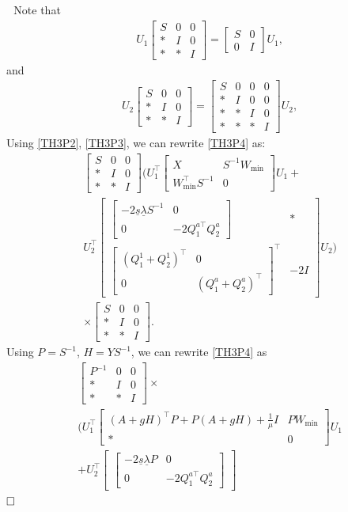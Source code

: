 \documentclass[journal,twoside,web]{ieeecolor}
\renewenvironment{proof}{\vspace{.1cm}\noindent{\sc Proof.}\hspace{0.10cm}\,\,}{$\hfill\Box$\vspace{.1cm}}
\newcommand{\bbm}[1]{\left[\begin{matrix} #1 \end{matrix}\right]}
\begin{document}
\begin{proof}
Note that
\begin{equation}\label{TH3P2}
\begin{aligned}
&U_1\bbm{
S&0&0\\\ast&I&0\\\ast&\ast&I
}=\bbm{
S&0\\0&I
}U_1,
\end{aligned}
\end{equation}
and
\begin{equation}\label{TH3P3}
\begin{aligned}
&U_2\bbm{
S&0&0\\\ast&I&0\\\ast&\ast&I
}=\bbm{
S&0&0&0\\\ast&I&0&0\\\ast&\ast&I&0\\\ast&\ast&\ast&I
}U_2,
\end{aligned}
\end{equation}
Using \eqref{TH3P2}, \eqref{TH3P3}, we can rewrite \eqref{TH3P4} as:
\begin{equation}\label{TH3P4}
\begin{aligned}
&\bbm{
S&0&0\\\ast&I&0\\\ast&\ast&I
}\Big(U_1^\top
\bbm{
X & S^{-1}W_{\min} \\
W_{\min}^{\top}S^{-1} & 0
}
U_1 +\\
& U_2^\top
\bbm{\bbm{-2\underline{s}\underline{\lambda}S^{-1}&0\\0&-2Q^{a\top}_1 Q^a_2}
 &\ast\\
\bbm{(Q^1_1+Q^1_2)^\top&0\\0&(Q^a_1+Q^a_2)^\top}^\top  & -2I
}
U_2\Big)\\&\times\bbm{
S&0&0\\\ast&I&0\\\ast&\ast&I
}.
\end{aligned}
\end{equation}
Using $P=S^{-1}$, $H=YS^{-1}$, we can rewrite \eqref{TH3P4} as
\begin{equation}\label{TH3P5}
\begin{aligned}
&\bbm{
P^{-1}&0&0\\\ast&I&0\\\ast&\ast&I
}\times\\&\Big(U_1^\top
\bbm{
(A+gH)^\top P+P(A+gH)+\frac{1}{\mu}I & PW_{\min} \\
\ast & 0
}
U_1 \\
&+ U_2^\top
\bbm{\bbm{-2\underline{s}\underline{\lambda}P&0\\0&-2Q^{a\top}_1 Q^a_2}
}
\end{aligned}
\end{equation}
\end{proof}
\end{document}
